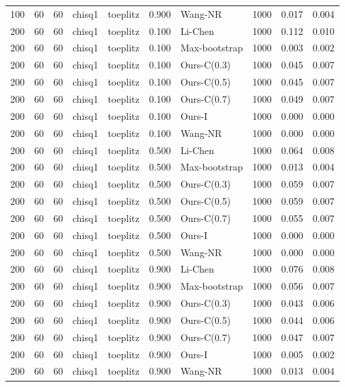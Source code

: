 \begin{tabular}{rrrllrlrrr}
100 & 60 & 60 & chisq1 & toeplitz & 0.900 & Wang-NR & 1000 & 0.017 & 0.004 \\
200 & 60 & 60 & chisq1 & toeplitz & 0.100 & Li-Chen & 1000 & 0.112 & 0.010 \\
200 & 60 & 60 & chisq1 & toeplitz & 0.100 & Max-bootstrap & 1000 & 0.003 & 0.002 \\
200 & 60 & 60 & chisq1 & toeplitz & 0.100 & Ours-C(0.3) & 1000 & 0.045 & 0.007 \\
200 & 60 & 60 & chisq1 & toeplitz & 0.100 & Ours-C(0.5) & 1000 & 0.045 & 0.007 \\
200 & 60 & 60 & chisq1 & toeplitz & 0.100 & Ours-C(0.7) & 1000 & 0.049 & 0.007 \\
200 & 60 & 60 & chisq1 & toeplitz & 0.100 & Ours-I & 1000 & 0.000 & 0.000 \\
200 & 60 & 60 & chisq1 & toeplitz & 0.100 & Wang-NR & 1000 & 0.000 & 0.000 \\
200 & 60 & 60 & chisq1 & toeplitz & 0.500 & Li-Chen & 1000 & 0.064 & 0.008 \\
200 & 60 & 60 & chisq1 & toeplitz & 0.500 & Max-bootstrap & 1000 & 0.013 & 0.004 \\
200 & 60 & 60 & chisq1 & toeplitz & 0.500 & Ours-C(0.3) & 1000 & 0.059 & 0.007 \\
200 & 60 & 60 & chisq1 & toeplitz & 0.500 & Ours-C(0.5) & 1000 & 0.059 & 0.007 \\
200 & 60 & 60 & chisq1 & toeplitz & 0.500 & Ours-C(0.7) & 1000 & 0.055 & 0.007 \\
200 & 60 & 60 & chisq1 & toeplitz & 0.500 & Ours-I & 1000 & 0.000 & 0.000 \\
200 & 60 & 60 & chisq1 & toeplitz & 0.500 & Wang-NR & 1000 & 0.000 & 0.000 \\
200 & 60 & 60 & chisq1 & toeplitz & 0.900 & Li-Chen & 1000 & 0.076 & 0.008 \\
200 & 60 & 60 & chisq1 & toeplitz & 0.900 & Max-bootstrap & 1000 & 0.056 & 0.007 \\
200 & 60 & 60 & chisq1 & toeplitz & 0.900 & Ours-C(0.3) & 1000 & 0.043 & 0.006 \\
200 & 60 & 60 & chisq1 & toeplitz & 0.900 & Ours-C(0.5) & 1000 & 0.044 & 0.006 \\
200 & 60 & 60 & chisq1 & toeplitz & 0.900 & Ours-C(0.7) & 1000 & 0.047 & 0.007 \\
200 & 60 & 60 & chisq1 & toeplitz & 0.900 & Ours-I & 1000 & 0.005 & 0.002 \\
200 & 60 & 60 & chisq1 & toeplitz & 0.900 & Wang-NR & 1000 & 0.013 & 0.004 \\

\end{tabular}
